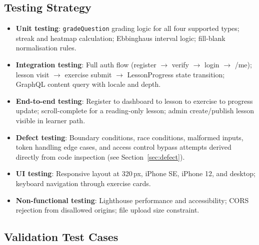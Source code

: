 \subsection{Testing Strategy}

\begin{itemize}[leftmargin=*]
  \item \textbf{Unit testing}: \texttt{gradeQuestion} grading logic for all four supported types; streak and heatmap calculation; Ebbinghaus interval logic; fill-blank normalisation rules.
  \item \textbf{Integration testing}: Full auth flow (register $\rightarrow$ verify $\rightarrow$ login $\rightarrow$ /me); lesson visit $\rightarrow$ exercise submit $\rightarrow$ LessonProgress state transition; GraphQL content query with locale and depth.
  \item \textbf{End-to-end testing}: Register to dashboard to lesson to exercise to progress update; scroll-complete for a reading-only lesson; admin create/publish lesson visible in learner path.
  \item \textbf{Defect testing}: Boundary conditions, race conditions, malformed inputs, token handling edge cases, and access control bypass attempts derived directly from code inspection (see Section~\ref{sec:defect}).
  \item \textbf{UI testing}: Responsive layout at 320\,px, iPhone SE, iPhone 12, and desktop; keyboard navigation through exercise cards.
  \item \textbf{Non-functional testing}: Lighthouse performance and accessibility; CORS rejection from disallowed origins; file upload size constraint.
\end{itemize}

\subsection{Validation Test Cases}

